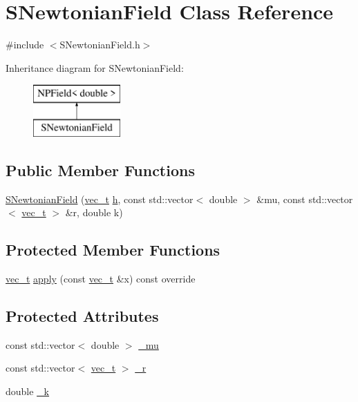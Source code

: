 \hypertarget{class_s_newtonian_field}{}\section{S\+Newtonian\+Field Class Reference}
\label{class_s_newtonian_field}


{\ttfamily \#include $<$S\+Newtonian\+Field.\+h$>$}

Inheritance diagram for S\+Newtonian\+Field\+:\begin{figure}[H]
\begin{center}
\leavevmode
\includegraphics[height=2.000000cm]{class_s_newtonian_field}
\end{center}
\end{figure}
\subsection*{Public Member Functions}
\begin{DoxyCompactItemize}
\item 
\mbox{\hyperlink{class_s_newtonian_field_a3e0816f9bbfd74f70b881562a0d590b5}{S\+Newtonian\+Field}} (\mbox{\hyperlink{group___n_algebra_ga0a2cfc67e738a3d73e4f12098c4c07f6}{vec\+\_\+t}} \mbox{\hyperlink{class_n_p_field_a21a56864db47d8589ec917764e3b2b85}{h}}, const std\+::vector$<$ double $>$ \&mu, const std\+::vector$<$ \mbox{\hyperlink{group___n_algebra_ga0a2cfc67e738a3d73e4f12098c4c07f6}{vec\+\_\+t}} $>$ \&r, double k)
\end{DoxyCompactItemize}
\subsection*{Protected Member Functions}
\begin{DoxyCompactItemize}
\item 
\mbox{\hyperlink{group___n_algebra_ga0a2cfc67e738a3d73e4f12098c4c07f6}{vec\+\_\+t}} \mbox{\hyperlink{class_s_newtonian_field_a1f42f77de6b77085a6a5f018fe44d41e}{apply}} (const \mbox{\hyperlink{group___n_algebra_ga0a2cfc67e738a3d73e4f12098c4c07f6}{vec\+\_\+t}} \&x) const override
\end{DoxyCompactItemize}
\subsection*{Protected Attributes}
\begin{DoxyCompactItemize}
\item 
const std\+::vector$<$ double $>$ \mbox{\hyperlink{class_s_newtonian_field_a2f447c353aa350e8e06f1167077a6577}{\+\_\+mu}}
\item 
const std\+::vector$<$ \mbox{\hyperlink{group___n_algebra_ga0a2cfc67e738a3d73e4f12098c4c07f6}{vec\+\_\+t}} $>$ \mbox{\hyperlink{class_s_newtonian_field_ae905751c50bc53c9c9ad020d5d0b68b1}{\+\_\+r}}
\item 
double \mbox{\hyperlink{class_s_newtonian_field_a6d87be6a91cbdd8b70890b00aac87127}{\+\_\+k}}
\end{DoxyCompactItemize}
